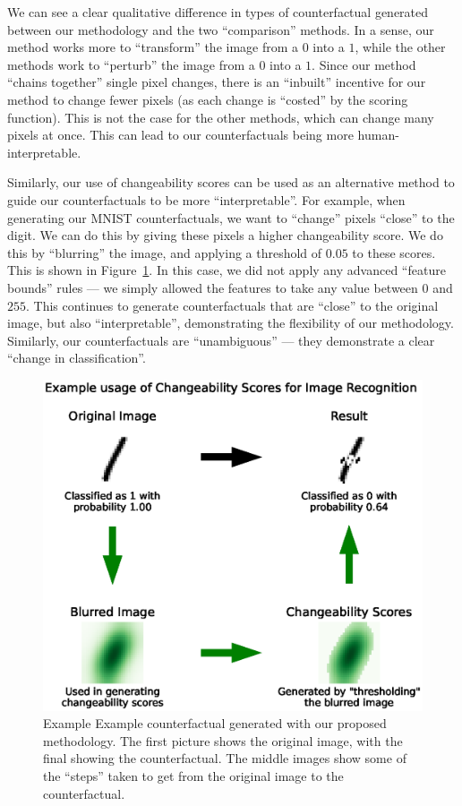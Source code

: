\documentclass{article}
\begin{document}
We can see a clear qualitative difference in types of counterfactual generated between our methodology and the two ``comparison'' methods. In a sense, our method works more to ``transform'' the image from a \(0\) into a \(1\), while the other methods work to ``perturb'' the image from a \(0\) into a \(1\). Since our method ``chains together'' single pixel changes, there is an ``inbuilt'' incentive for our method to change fewer pixels (as each change is ``costed'' by the scoring function). This is not the case for the other methods, which can change many pixels at once. This can lead to our counterfactuals being more human-interpretable.

Similarly, our use of changeability scores can be used as an alternative method to guide our counterfactuals to be more ``interpretable''. For example, when generating our MNIST counterfactuals, we want to ``change'' pixels ``close'' to the digit. We can do this by giving these pixels a higher changeability score. We do this by ``blurring'' the image, and applying a threshold of \(0.05\) to these scores. This is shown in Figure~\ref{figure:mnist_counterfactuals_changeability}. In this case, we did not apply any advanced ``feature bounds'' rules --- we simply allowed the features to take any value between \(0\) and \(255\). This continues to generate counterfactuals that are ``close'' to the original image, but also ``interpretable'', demonstrating the flexibility of our methodology. Similarly, our counterfactuals are ``unambiguous'' --- they demonstrate a clear ``change in classification''.

\begin{figure}
    \centering
    \includegraphics[width=\linewidth]{figures/mnist_changeability_example.eps}
    \caption{Example Example counterfactual generated with our proposed methodology. The first picture shows the original image, with the final showing the counterfactual. The middle images show some of the ``steps'' taken to get from the original image to the counterfactual.\label{figure:mnist_counterfactuals_changeability}}
\end{figure}
\end{document}
